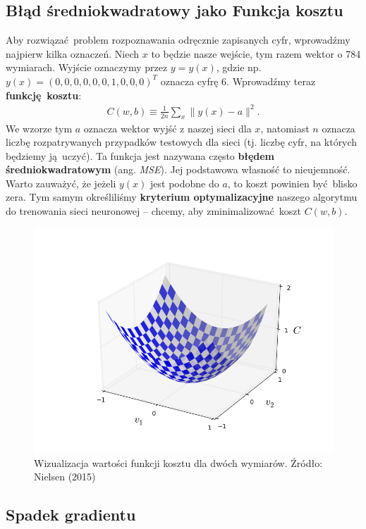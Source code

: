 \documentclass[10pt, oneside]{article}
\theoremstyle{remark}
\begin{document}
\subsection{Błąd średniokwadratowy jako Funkcja kosztu}
Aby rozwiązać problem rozpoznawania odręcznie zapisanych cyfr, wprowadźmy najpierw kilka oznaczeń.
Niech $x$ to będzie nasze wejście, tym razem wektor o 784 wymiarach.
Wyjście oznaczymy przez $y=y(x)$, gdzie np. $y(x) = (0, 0, 0, 0, 0, 0, 1, 0, 0, 0)^T$ oznacza cyfrę 6.
Wprowadźmy teraz \textbf{funkcję kosztu}:
\begin{eqnarray}  C(w,b) \equiv
  \frac{1}{2n} \sum_x \| y(x) - a\|^2.
\end{eqnarray}
We wzorze tym $a$ oznacza wektor wyjść z naszej sieci dla $x$, natomiast $n$ oznacza liczbę rozpatrywanych przypadków testowych dla sieci (tj. liczbę cyfr, na których będziemy ją uczyć).
Ta funkcja jest nazywana często \textbf{błędem średniokwadratowym} (ang. \emph{MSE}).
Jej podstawowa własność to nieujemność.
Warto zauważyć, że jeżeli $y(x)$ jest podobne do $a$, to koszt powinien być blisko zera.
Tym samym określiliśmy \textbf{kryterium optymalizacyjne} naszego algorytmu do trenowania sieci neuronowej -- chcemy, aby zminimalizować koszt $C(w, b)$.
\begin{figure}[!htpb]
	\centering
	\includegraphics[width=.7\linewidth]{figures/valley}
	\caption{Wizualizacja wartości funkcji kosztu dla dwóch wymiarów. Źródło: Nielsen (2015)}
\end{figure}


\subsection{Spadek gradientu}
\end{document}
